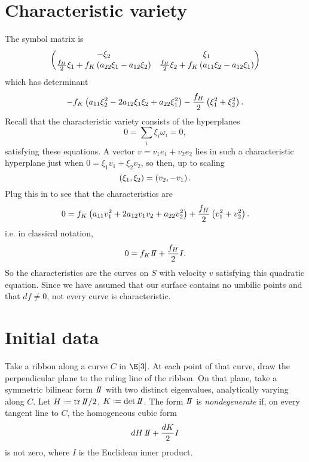 \section{Characteristic variety}
The symbol matrix is
\[
\begin{pmatrix}
-\xi_2 & \xi_1 \\
\frac{f_H}{2} \xi_1 +
f_K\left(a_{22} \xi_1 - a_{12} \xi_2\right)
&
\frac{f_H}{2} \xi_2
+
f_K\left(a_{11} \xi_2 - a_{12} \xi_1\right)
\end{pmatrix}
\]
which has determinant
\[
-f_K
\left(
a_{11} \xi_2^2 -2 a_{12} \xi_1 \xi_2 + a_{22} \xi_1^2
\right)
- 
\frac{f_H}{2}
\left(\xi_1^2+\xi_2^2\right).
\]
Recall that the characteristic variety consists of the hyperplanes 
\[
0 = \sum_i \xi_i \omega_i=0,
\] 
satisfying these equations.
A vector \(v=v_1 e_1+v_2 e_2\) lies in such a characteristic hyperplane just when \(0 = \xi_1 v_1 + \xi_2 v_2\), so then, up to scaling 
\[
\left(\xi_1,\xi_2\right)=\left(v_2,-v_1\right).
\]
Plug this in to see that the characteristics are 
\[
0 = f_K\left(a_{11} v_1^2 + 2a_{12} v_1 v_2 + a_{22} v_2^2\right) + \frac{f_H}{2}\left(v_1^2+v_2^2\right).
\]
i.e. in classical notation,
\[
0 = f_K \shapeOp + \frac{f_H}{2} I.
\]
So the characteristics are the curves on \(S\) with velocity \(v\) satisfying this quadratic equation.
Since we have assumed that our surface contains no umbilic points and that \(df\ne 0\), not every curve is characteristic.

\section{Initial data}
Take a ribbon along a curve \(C\) in \(\E[3]\).
At each point of that curve, draw the perpendicular plane to the ruling line of the ribbon.
On that plane, take a symmetric bilinear form \(\shapeOp\) with two distinct eigenvalues, analytically varying along \(C\).
Let \(H\defeq \operatorname{tr} \shapeOp/2\), \(K\defeq \det \shapeOp\).
The form \(\shapeOp\) is \emph{nondegenerate} if, on every tangent line to \(C\), the homogeneous cubic form
\[
dH \, \shapeOp + \frac{dK}{2} I
\]
is not zero, where \(I\) is the Euclidean inner product.

